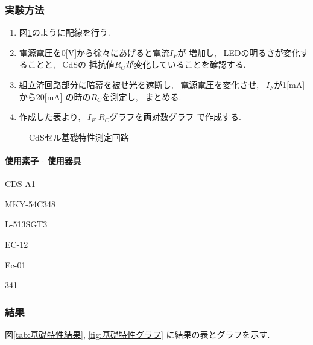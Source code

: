 \documentclass[titlepage]{jsarticle}
\begin{document}
        \subsubsection{実験方法}
            \begin{enumerate}
                \item 図\ref{fig:基礎特性}のように配線を行う.
                \item 電源電圧を0[V]から徐々にあげると電流$I_F$が
                    増加し, ~LEDの明るさが変化することと, ~CdSの
                    抵抗値$R_C$が変化していることを確認する.
                \item 組立済回路部分に暗幕を被せ光を遮断し,
                    ~電源電圧を変化させ, ~$I_F$が1[mA]から20[mA]
                    の時の$R_C$を測定し, ~まとめる.
                \item 作成した表より, ~$I_F$-$R_C$グラフを両対数グラフ
                    で作成する.
            \end{enumerate}

            \begin{figure}[ht]
                \centering
                \caption{CdSセル基礎特性測定回路}
                \label{fig:基礎特性}
            \end{figure}

            \paragraph{使用素子 $\cdot$ 使用器具}
                \begin{description}
                    \setlength{\leftskip}{1.5em}
                    \item[組立済回路] CDS-A1
                    \item[CdSセル] MKY-54C348
                    \item[LED] L-513SGT3
                    \item[デジタルマルチメータ] EC-12
                    \item[直流電源] Ec-01
                    \item[電流計] 341 
                \end{description}
                

        \subsubsection{結果}
            図\ref{tab:基礎特性結果}, \ref{fig:基礎特性グラフ}
            に結果の表とグラフを示す.
\end{document}
